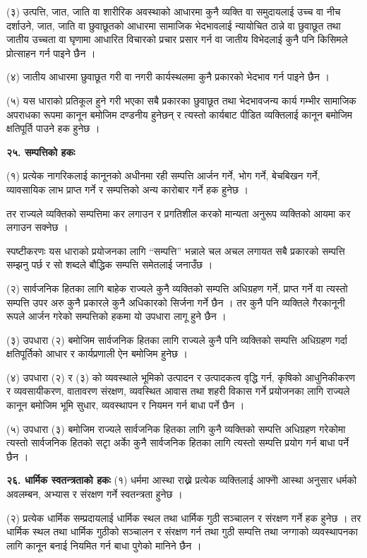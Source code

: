 (३) उत्पत्ति, जात, जाति वा शारीरिक अवस्थाको आधारमा कुनै व्यक्ति वा समुदायलाई उच्च वा नीच दर्शाउने, जात, जाति वा छुवाछूतको आधारमा सामाजिक भेदभावलाई न्यायोचित ठान्ने वा छुवाछूत तथा जातीय उच्चता वा घृणामा आधारित विचारको प्रचार प्रसार गर्न वा जातीय विभेदलाई कुनै पनि किसिमले प्रोत्साहन गर्न पाइने छैन ।

(४) जातीय आधारमा छुवाछूत गरी वा नगरी कार्यस्थलमा कुनै प्रकारको भेदभाव गर्न पाइने छैन ।

(५) यस धाराको प्रतिकूल हुने गरी भएका सबै प्रकारका छुवाछूत तथा भेदभावजन्य कार्य गम्भीर सामाजिक अपराधका रूपमा कानून बमोजिम दण्डनीय हुनेछन् र त्यस्तो कार्यबाट पीडित व्यक्तिलाई कानून बमोजिम क्षतिपूर्ति पाउने हक हुनेछ ।

\textbf{२५. सम्पत्तिको हकः}

(१) प्रत्येक नागरिकलाई कानूनको अधीनमा रही सम्पत्ति आर्जन गर्ने, भोग गर्ने, बेचबिखन गर्ने, व्यावसायिक लाभ प्राप्त गर्ने र सम्पत्तिको अन्य कारोबार गर्ने हक हुनेछ ।

तर राज्यले व्यक्तिको सम्पत्तिमा कर लगाउन र प्रगतिशील करको मान्यता अनुरूप व्यक्तिको आयमा कर लगाउन सक्नेछ ।

स्पष्टीकरणः यस धाराको प्रयोजनका लागि “सम्पत्ति” भन्नाले चल अचल लगायत सबै प्रकारको सम्पत्ति सम्झनु पर्छ र सो शब्दले बौद्धिक सम्पत्ति समेतलाई जनाउँछ ।

(२) सार्वजनिक हितका लागि बाहेक राज्यले कुनै व्यक्तिको सम्पत्ति अधिग्रहण गर्ने, प्राप्त गर्ने वा त्यस्तो सम्पत्ति उपर अरु कुनै प्रकारले कुनै अधिकारको सिर्जना गर्ने छैन । तर कुनै पनि व्यक्तिले गैरकानूनी रूपले आर्जन गरेको सम्पत्तिको हकमा यो उपधारा लागू हुने छैन ।

(३) उपधारा (२) बमोजिम सार्वजनिक हितका लागि राज्यले कुनै पनि व्यक्तिको सम्पत्ति अधिग्रहण गर्दा क्षतिपूर्तिको आधार र कार्यप्रणाली ऐन बमोजिम हुनेछ ।

(४) उपधारा (२) र (३) को व्यवस्थाले भूमिको उत्पादन र उत्पादकत्व वृद्धि गर्न, कृषिको आधुनिकीकरण र व्यवसायीकरण, वातावरण संरक्षण, व्यवस्थित आवास तथा शहरी विकास गर्ने प्रयोजनका लागि राज्यले कानून बमोजिम भूमि सुधार, व्यवस्थापन र नियमन गर्न बाधा पर्ने छैन ।

(५) उपधारा (३) बमोजिम राज्यले सार्वजनिक हितका लागि कुनै व्यक्तिको सम्पत्ति अधिग्रहण गरेकोमा त्यस्तो सार्वजनिक हितको सटृा अर्काे कुनै सार्वजनिक हितका लागि त्यस्तो सम्पत्ति प्रयोग गर्न बाधा पर्ने छैन ।

\textbf{२६. धार्मिक स्वतन्त्रताको हकः} (१) धर्ममा आस्था राख्ने प्रत्येक व्यक्तिलाई आफ्नोे आस्था अनुसार धर्मको अवलम्बन, अभ्यास र संरक्षण गर्ने स्वतन्त्रता हुनेछ ।

(२) प्रत्येक धार्मिक सम्प्रदायलाई धार्मिक स्थल तथा धार्मिक गुठी सञ्चालन र संरक्षण गर्ने हक हुनेछ । तर धार्मिक स्थल तथा धार्मिक गुठीको सञ्चालन र संरक्षण गर्न तथा गुठी सम्पत्ति तथा जग्गाको व्यवस्थापनका लागि कानून बनाई नियमित गर्न बाधा पुगेको मानिने छैन ।

